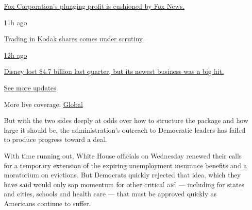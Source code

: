 \href{https://www.nytimes3xbfgragh.onion/live/2020/08/04/business/stock-market-today-coronavirus?action=click\&pgtype=Article\&state=default\&region=MAIN_CONTENT_1\&context=storylines_live_updates\#fox-corporations-plunging-profit-is-cushioned-by-fox-news}{Fox
Corporation's plunging profit is cushioned by Fox News.}

\href{https://www.nytimes3xbfgragh.onion/live/2020/08/04/business/stock-market-today-coronavirus?action=click\&pgtype=Article\&state=default\&region=MAIN_CONTENT_1\&context=storylines_live_updates\#trading-in-kodak-shares-comes-under-scrutiny}{11h
ago}

\href{https://www.nytimes3xbfgragh.onion/live/2020/08/04/business/stock-market-today-coronavirus?action=click\&pgtype=Article\&state=default\&region=MAIN_CONTENT_1\&context=storylines_live_updates\#trading-in-kodak-shares-comes-under-scrutiny}{Trading
in Kodak shares comes under scrutiny.}

\href{https://www.nytimes3xbfgragh.onion/live/2020/08/04/business/stock-market-today-coronavirus?action=click\&pgtype=Article\&state=default\&region=MAIN_CONTENT_1\&context=storylines_live_updates\#disney-lost-4-7-billion-last-quarter-but-its-newest-business-was-a-big-hit}{12h
ago}

\href{https://www.nytimes3xbfgragh.onion/live/2020/08/04/business/stock-market-today-coronavirus?action=click\&pgtype=Article\&state=default\&region=MAIN_CONTENT_1\&context=storylines_live_updates\#disney-lost-4-7-billion-last-quarter-but-its-newest-business-was-a-big-hit}{Disney
lost \$4.7 billion last quarter, but its newest business was a big hit.}

\href{https://www.nytimes3xbfgragh.onion/live/2020/08/04/business/stock-market-today-coronavirus?action=click\&pgtype=Article\&state=default\&region=MAIN_CONTENT_1\&context=storylines_live_updates}{See
more updates}

More live coverage:
\href{https://www.nytimes3xbfgragh.onion/2020/08/04/world/coronavirus-cases.html?action=click\&pgtype=Article\&state=default\&region=MAIN_CONTENT_1\&context=storylines_live_updates}{Global}

But with the two sides deeply at odds over how to structure the package
and how large it should be, the administration's outreach to Democratic
leaders has failed to produce progress toward a deal.

With time running out, White House officials on Wednesday renewed their
calls for a temporary extension of the expiring unemployment insurance
benefits and a moratorium on evictions. But Democrats quickly rejected
that idea, which they have said would only sap momentum for other
critical aid --- including for states and cities, schools and health
care --- that must be approved quickly as Americans continue to suffer.


